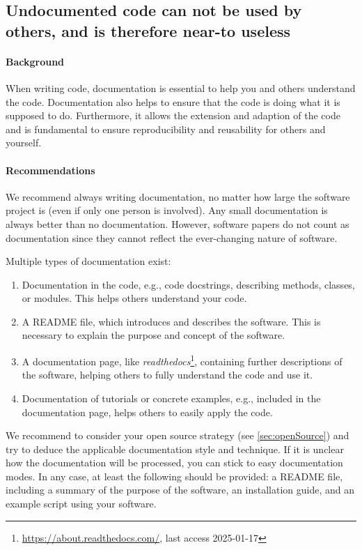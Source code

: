 \subsection{Undocumented code can not be used by others, and is therefore near-to useless}\label{sec:documentation}

\paragraph{Background} When writing code, documentation is essential to help you and others understand the code. 
Documentation also helps to ensure that the code is doing what it is supposed to do. Furthermore, it allows the extension and adaption of the code and is fundamental to ensure reproducibility and reusability for others and yourself.\par

\paragraph{Recommendations} We recommend always writing documentation, no matter how large the software project is (even if only one person is involved). Any small documentation is always better than no documentation. However, software papers do not count as documentation since they cannot reflect the ever-changing nature of software.  \par
Multiple types of documentation exist:
\begin{enumerate}
    \item Documentation in the code, e.g., code docstrings, describing methods, classes, or modules. This helps others understand your code.
    \item A README file, which introduces and describes the software. This is necessary to explain the purpose and concept of the software.
    \item A documentation page, like \textit{readthedocs}\footnote{\url{https://about.readthedocs.com/}, last access 2025-01-17}, containing further descriptions of the software, helping others to fully understand the code and use it.
    \item Documentation of tutorials or concrete examples, e.g., included in the documentation page, helps others to easily apply the code.
\end{enumerate}

We recommend to consider your open source strategy (see \ref{sec:openSource}) and try to deduce the applicable documentation style and technique. If it is unclear how the documentation will be processed, you can stick to easy documentation modes. In any case, at least the following should be provided: a README file, including a summary of the purpose of the software, an installation guide, and an example script using your software.


